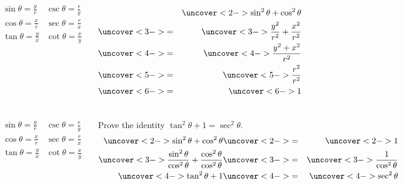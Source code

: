 \begin{frame}
\begin{columns}[c]
\trigIdentitiesPicture
\[
\begin{array}{cc}
\sin \theta = \frac{ y}{ r} &
\csc \theta = \frac{ r}{ y} \\
\cos \theta = \frac{ x}{ r} &
\sec \theta = \frac{ r}{ x} \\
\tan \theta = \frac{ y}{ x} &
\cot \theta = \frac{ x}{ y} \\
\end{array}
\]

\vspace{3cm}
\begin{eqnarray*}
& & \uncover<2->{\sin^2 \theta + \cos^2 \theta}\\
& \uncover<3->{=} & \uncover<3->{\frac{y^2}{r^2} + \frac{x^2}{r^2}}\\
& \uncover<4->{=} & \uncover<4->{\frac{y^2+x^2}{r^2}}\\
& \uncover<5->{=} & \uncover<5->{\frac{r^2}{r^2}}\\
& \uncover<6->{=} & \uncover<6->{1}
\end{eqnarray*}
%
\end{columns}
\end{frame}


\begin{frame}
\begin{columns}[c]
\trigIdentitiesPicture
\[
\begin{array}{cc}
\sin \theta = \frac{ y}{ r} &
\csc \theta = \frac{ r}{ y} \\
\cos \theta = \frac{ x}{ r} &
\sec \theta = \frac{ r}{ x} \\
\tan \theta = \frac{ y}{ x} &
\cot \theta = \frac{ x}{ y} \\
\end{array}
\]

\vspace{3cm}
\begin{example}[$\tan^2 \theta + 1 = \sec^2 \theta$]
Prove the identity $\tan^2 \theta + 1 = \sec^2 \theta$.
\begin{eqnarray*}
\uncover<2->{\sin^2 \theta + \cos^2 \theta} & \uncover<2->{=} & \uncover<2->{1}\\
\uncover<3->{\frac{\sin^2 \theta}{\cos^2\theta} + \frac{\cos^2 \theta}{\cos^2\theta}} & \uncover<3->{=} & \uncover<3->{\frac{1}{\cos^2\theta}}\\
\uncover<4->{\tan^2 \theta + 1} & \uncover<4->{=} & \uncover<4->{\sec^2\theta}
\end{eqnarray*}
\end{example}
\end{columns}
\end{frame}



